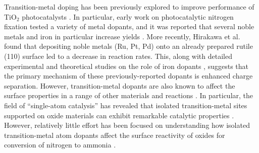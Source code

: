 Transition-metal doping has been previously explored to improve performance of TiO$_2$ photocatalysts \cite{Schneider_2014, Li_2007, Dozzi_2013}. In particular, early work on photocatalytic nitrogen fixation tested a variety of metal dopants, and it was reported that several noble metals \cite{Ranjit_1996} and iron in particular increase yields \cite{Schrauzer_1977,Schrauzer_1983, Augugliaro_1982,Soria_1991, Ranjit_1996,Ranjit_1997}. More recently, Hirakawa et al. found that depositing noble metals (Ru, Pt, Pd) onto an already prepared rutile (110) surface led to a decrease in reaction rates.\cite{Hirakawa_2017} This, along with detailed experimental and theoretical studies on the role of iron dopants ,\cite{Soria_1991, Comer_2018} suggests that the primary mechanism of these previously-reported dopants is enhanced charge separation. However, transition-metal dopants are also known to affect the surface properties in a range of other materials and reactions \cite{Khan_2018,Gu_2014, Ammal_2016, Gu_2017,Comer_2018, Garc_a_Mota_2011, Yao_2017}. In particular, the field of ``single-atom catalysis'' has revealed that isolated transition-metal sites supported on oxide materials can exhibit remarkable catalytic properties \cite{Liu_2016, Qiao_2011, O_Connor_2018}. However, relatively little effort has been focused on understanding how isolated transition-metal atom dopants affect the surface reactivity of oxides for conversion of nitrogen to ammonia \cite{Tao_2019, Liu_2019, Zhao_2019, Cheng_2019, Li_2017}.




